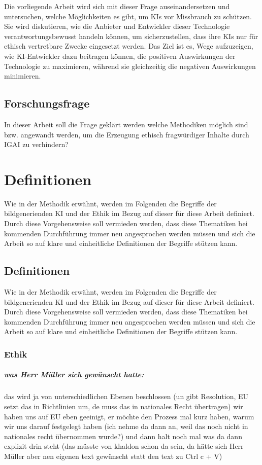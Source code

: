 \documentclass[12pt]{article}
\begin{document}
 Die vorliegende Arbeit wird sich mit dieser Frage auseinandersetzen und untersuchen, welche Möglichkeiten es gibt, um KIs vor 
 Missbrauch zu schützen. Sie wird diskutieren, wie die Anbieter und Entwickler dieser Technologie verantwortungsbewusst 
 handeln können, um sicherzustellen, dass ihre KIs nur für ethisch vertretbare Zwecke eingesetzt werden. Das Ziel ist es, 
 Wege aufzuzeigen, wie KI-Entwickler dazu beitragen können, die positiven Auswirkungen der Technologie zu maximieren, 
 während sie gleichzeitig die negativen Auswirkungen minimieren.
 \section{Forschungsfrage}
 In dieser Arbeit soll die Frage geklärt werden welche Methodiken möglich sind bzw. angewandt werden, um die Erzeugung ethisch 
 fragwürdiger Inhalte durch IGAI zu verhindern?
 

\chapter{Definitionen}
Wie in der Methodik erwähnt, werden im Folgenden die Begriffe der bildgenerienden KI und der Ethik im Bezug auf dieser für diese Arbeit definiert. 
Durch diese Vorgehensweise soll vermieden werden, dass diese Thematiken bei kommenden Durchführung immer neu angesprochen werden müssen und sich die Arbeit so auf klare und einheitliche Definitionen der Begriffe stützen kann.

\section{Definitionen}
Wie in der Methodik erwähnt, werden im Folgenden die Begriffe der bildgenerienden KI und der Ethik im Bezug auf dieser für diese Arbeit definiert. 
Durch diese Vorgehensweise soll vermieden werden, dass diese Thematiken bei kommenden Durchführung immer neu angesprochen werden müssen und sich die Arbeit so auf klare und einheitliche Definitionen der Begriffe stützen kann.

\subsection{Ethik}\label{subsection:ethicsdefinition}
\paragraph{was Herr Müller sich gewünscht hatte:} 
das wird ja von unterschiedlichen Ebenen beschlossen (un gibt Resolution, EU setzt das in Richtlinien um, de muss das in nationales Recht übertragen) wir haben uns auf EU eben geeinigt, er möchte den Prozess mal kurz haben, warum wir uns darauf festgelegt haben (ich nehme da dann an, weil das noch nicht in nationales recht übernommen wurde?) und dann halt noch mal was da dann explizit drin steht (das müsste von khaldon schon da sein, da hätte sich Herr Müller aber nen eigenen text gewünscht statt den text zu Ctrl c + V)
\end{document}
